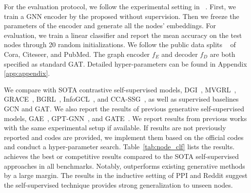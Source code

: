 For the evaluation protocol, we follow the experimental setting in ~\cite{velivckovic2018deep,hassani2020contrastive,thakoor2021bootstrapped,zhang2021canonical}. 
First, we train a GNN encoder by the proposed \model without supervision. 
Then we freeze the parameters of the encoder and generate all the nodes' embeddings. 
For evaluation, we train a linear classifier and report the mean accuracy on the test nodes through 20 random initializations. 
We follow the public data splits ~\cite{velivckovic2018deep,hassani2020contrastive,zhang2021canonical}  of Cora, Citeseer, and PubMed. 
The graph encoder $f_E$ and decoder $f_D$ are both specified as standard GAT. 
Detailed hyper-parameters can be found in  Appendix \ref{app:appendix}.


We compare  \model with SOTA  contrastive self-supervised models, DGI~\cite{velivckovic2018deep}, MVGRL~\cite{hassani2020contrastive}, GRACE~\cite{zhu2020deep}, BGRL~\cite{thakoor2021bootstrapped}, InfoGCL~\cite{Xu2021InfoGCLIG}, and CCA-SSG~\cite{zhang2021canonical}, as well as supervised baselines GCN and GAT. 
We also report the results of previous generative self-supervised models, GAE~\cite{kipf2016variational}, GPT-GNN~\cite{hu2020gpt}, and GATE~\cite{amin2020gate}.
We report results from previous works with the same experimental setup if available.
If results are not previously reported and codes are provided, we implement them based on the official codes and conduct a hyper-parameter search. 
Table~\ref{tab:node_clf} lists the results. 
\model achieves the best or competitive results compared to the SOTA self-supervised approaches in all benchmarks. 
Notably, \model outperforms existing generative methods by a large margin. 
The results in the inductive setting of PPI and Reddit suggest the self-supervised \model technique provides strong generalization to unseen nodes. 







